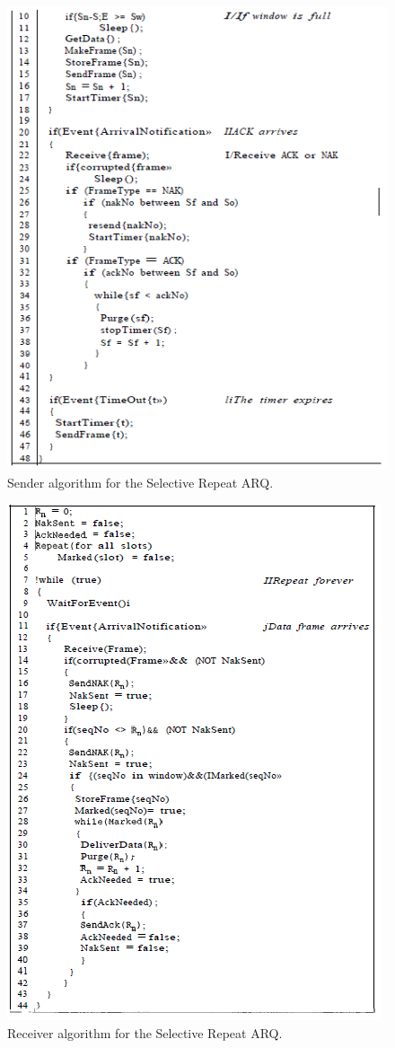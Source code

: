 \documentclass[12pt,a4paper]{report}
\begin{document}
\begin{figure}[H]
\begin{center}
\includegraphics[scale=1]{senderselective2.PNG} 
\caption{Sender algorithm for the Selective Repeat ARQ.}
\end{center}
\end{figure}
\begin{figure}[H]
\begin{center}
\includegraphics[scale=1]{receiverselective.PNG}  
\caption{Receiver algorithm for the Selective Repeat ARQ.}
\end{center}
\end{figure}
\end{document}
